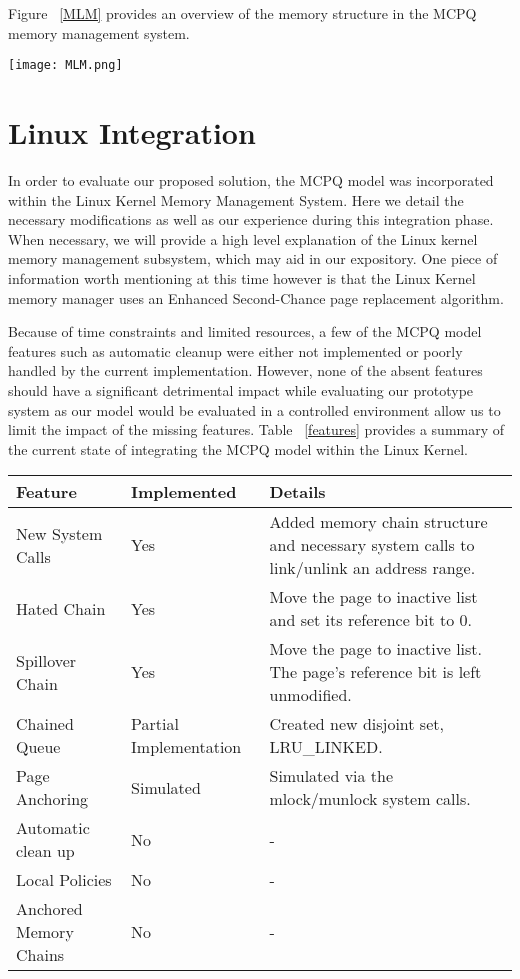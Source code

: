 \documentclass[10pt,a4paper,twocolumn]{article}
\begin{document}
Figure ~\ref{MLM} provides an overview of the memory structure in the MCPQ memory management system.

\begin{figure*}[htbp]
\centering
\texttt{[image: MLM.png]}
\caption{\emph{\small Memory Representation in MCPQ Mode}}
\label{MLM}
\end{figure*}

\section{Linux Integration}
In order to evaluate our proposed solution, the MCPQ model was incorporated within the Linux Kernel
Memory Management System. Here we detail the necessary modifications as well as our experience
during this integration phase. When necessary, we will provide a high level explanation of the Linux
kernel memory management subsystem, which may aid in our expository. One piece of information worth
mentioning at this time however is that the Linux Kernel memory manager uses an Enhanced
Second-Chance page replacement algorithm. 
 
Because of time constraints and limited resources, a few of the MCPQ model features such as
automatic cleanup were either not implemented or poorly handled by the current implementation.
However, none of the absent features should have a significant detrimental impact while evaluating
our prototype system as our model would be evaluated in a controlled environment allow us to limit
the impact of the missing features. Table ~\ref{features} provides a summary of the current state of
integrating the MCPQ model within the Linux Kernel.

\begin{table*}[htbp]
\centering
{\small 
\begin{tabularx}{\textwidth}{|l|l|X|}\hline
\textbf{Feature} & \textbf{Implemented} & \textbf{Details}\\ \hline \hline
New System Calls & Yes & Added memory chain structure and necessary system calls to link/unlink an address range. \\ \hline
Hated Chain & Yes & Move the page to inactive list and set its reference bit to 0. \\ \hline
Spillover Chain & Yes & Move the page to inactive list. The page's reference bit is left unmodified. \\ \hline
Chained Queue & Partial Implementation & Created new disjoint set, LRU\_LINKED. \\ \hline
Page Anchoring & Simulated & Simulated via the mlock/munlock system calls. \\ \hline
Automatic clean up & No & - \\ \hline
Local Policies & No & - \\ \hline
Anchored Memory Chains & No & - \\ \hline
\end{tabularx}
}
\caption{\emph{\small Summary of MCPQ implementation details.}}
\label{features}
\end{table*}
\end{document}
